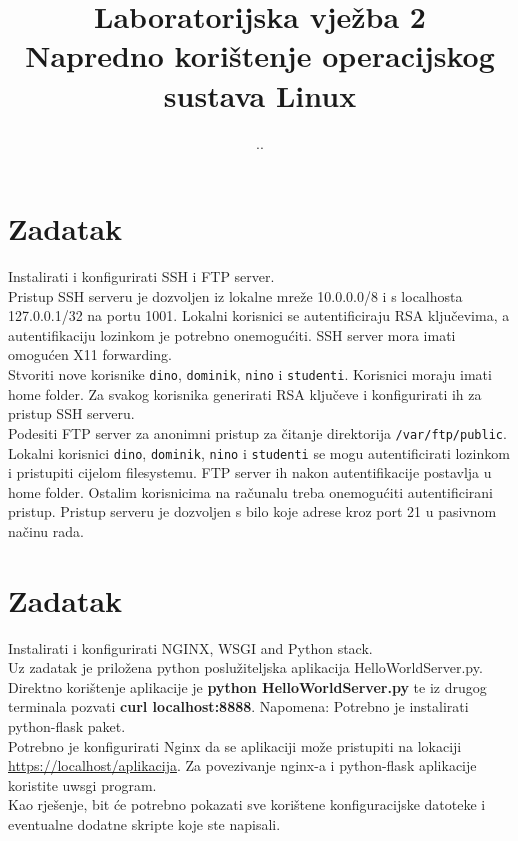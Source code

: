 \documentclass[12pt,a4paper]{article}
\renewcommand{\dateseparator}{.}
\newcommand{\todayiso}{\twodigit\day \dateseparator \twodigit\month \dateseparator \the \year}
\begin{document}
    \title{Laboratorijska vježba 2\\{\large Napredno korištenje operacijskog sustava Linux}}
    \date{\todayiso}
	\date{\vspace{-5ex} }
	\maketitle
	

\section{Zadatak}

Instalirati i konfigurirati SSH i FTP server.\\

Pristup SSH serveru je dozvoljen iz lokalne mreže 10.0.0.0/8 i s localhosta 127.0.0.1/32 na portu 1001. Lokalni korisnici se autentificiraju RSA ključevima, a autentifikaciju lozinkom je potrebno onemogućiti. SSH server mora imati omogućen X11 forwarding.\\
Stvoriti nove korisnike \texttt{dino}, \texttt{dominik}, \texttt{nino} i \texttt{studenti}. Korisnici moraju imati home folder. Za svakog korisnika generirati RSA ključeve i konfigurirati ih za pristup SSH serveru.\\

Podesiti FTP server za anonimni pristup za čitanje direktorija \texttt{/var/ftp/public}. Lokalni korisnici \texttt{dino}, \texttt{dominik}, \texttt{nino} i \texttt{studenti} se mogu autentificirati lozinkom i pristupiti cijelom filesystemu. FTP server ih nakon autentifikacije postavlja u home folder. Ostalim korisnicima na računalu treba onemogućiti autentificirani pristup. Pristup serveru je dozvoljen s bilo koje adrese kroz port 21 u pasivnom načinu rada.\\



\section{Zadatak}

Instalirati i konfigurirati NGINX, WSGI and Python stack. \\

Uz zadatak je priložena python poslužiteljska aplikacija HelloWorldServer.py. \\
Direktno korištenje aplikacije je \textbf{python HelloWorldServer.py} te iz drugog terminala pozvati \textbf{curl localhost:8888}.
Napomena: Potrebno je instalirati python-flask paket. \\

Potrebno je konfigurirati Nginx da se aplikaciji može pristupiti na lokaciji \url{https://localhost/aplikacija}. 
Za povezivanje nginx-a i python-flask aplikacije koristite uwsgi program. \\

Kao rješenje, bit će potrebno pokazati sve korištene konfiguracijske datoteke i eventualne dodatne skripte koje ste napisali.
\end{document}
